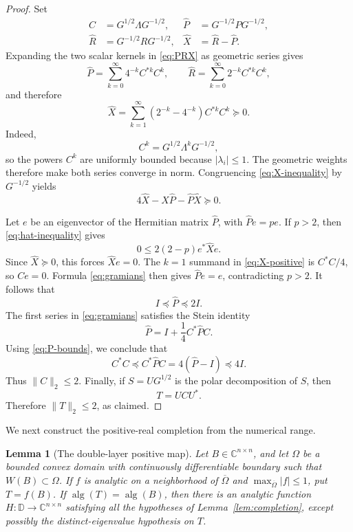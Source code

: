 \documentclass[11pt]{article}
\newtheorem{lemma}{Lemma}
\newcommand{\D}{\mathbb D}
\newcommand{\C}{\mathbb C}
\newcommand{\alg}{\operatorname{alg}}
\begin{document}
\begin{proof}
Set
\[
 \begin{aligned}
 C&=G^{1/2}\Lambda G^{-1/2},
 &\widehat P&=G^{-1/2}PG^{-1/2},\\
 \widehat R&=G^{-1/2}RG^{-1/2},
 &\widehat X&=\widehat R-\widehat P.
 \end{aligned}
\]
Expanding the two scalar kernels in \eqref{eq:PRX} as geometric series
gives
\begin{equation}
 \widehat P=\sum_{k=0}^{\infty}4^{-k}C^{*k}C^k,
 \qquad
 \widehat R=\sum_{k=0}^{\infty}2^{-k}C^{*k}C^k,
 \label{eq:gramians}
\end{equation}
and therefore
\begin{equation}
 \widehat X=
 \sum_{k=1}^{\infty}(2^{-k}-4^{-k})C^{*k}C^k\succeq0.
 \label{eq:X-positive}
\end{equation}
Indeed,
\[
 C^k=G^{1/2}\Lambda^kG^{-1/2},
\]
so the powers \(C^k\) are uniformly bounded because
\(|\lambda_i|\leq1\).  The geometric weights therefore make both series
converge in norm.  Congruencing \eqref{eq:X-inequality} by \(G^{-1/2}\)
yields
\begin{equation}
 4\widehat X-\widehat X\widehat P-
 \widehat P\widehat X\succeq0.
 \label{eq:hat-inequality}
\end{equation}

Let \(e\) be an eigenvector of the Hermitian matrix \(\widehat P\), with
\(\widehat Pe=pe\).  If \(p>2\), then \eqref{eq:hat-inequality} gives
\[
 0\leq 2(2-p)e^*\widehat Xe.
\]
Since \(\widehat X\succeq0\), this forces \(\widehat Xe=0\).  The
\(k=1\) summand in \eqref{eq:X-positive} is \(C^*C/4\), so \(Ce=0\).
Formula \eqref{eq:gramians} then gives \(\widehat Pe=e\), contradicting
\(p>2\).  It follows that
\begin{equation}
 I\preceq\widehat P\preceq2I.
 \label{eq:P-bounds}
\end{equation}
The first series in \eqref{eq:gramians} satisfies the Stein identity
\[
 \widehat P=I+\frac14 C^*\widehat PC.
\]
Using \eqref{eq:P-bounds}, we conclude that
\[
 C^*C\preceq C^*\widehat PC
 =4(\widehat P-I)\preceq4I.
\]
Thus \(\|C\|_2\leq2\).  Finally, if \(S=UG^{1/2}\) is the polar
decomposition of \(S\), then
\[
 T=UCU^*.
\]
Therefore \(\|T\|_2\leq2\), as claimed.
\end{proof}

We next construct the positive-real completion from the numerical range.

\begin{lemma}[The double-layer positive map]
\label{lem:double-layer}
Let \(B\in\C^{n\times n}\), and let \(\Omega\) be a bounded convex domain
with continuously differentiable boundary such that
\(W(B)\subset\Omega\).  If \(f\) is analytic on a neighborhood of
\(\overline\Omega\) and \(\max_{\overline\Omega}|f|\leq1\), put
\(T=f(B)\).  If \(\alg(T)=\alg(B)\), then there is an analytic function
\(H:\D\to\C^{n\times n}\) satisfying all the hypotheses of
Lemma~\ref{lem:completion}, except possibly the distinct-eigenvalue
hypothesis on \(T\).
\end{lemma}
\end{document}
